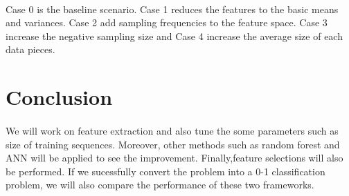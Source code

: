 \documentclass{article}
\begin{document}
	\paragraph{}Case 0 is the baseline scenario. Case 1 reduces the features to the basic means and variances. Case 2 add sampling frequencies to the feature space. Case 3 increase the negative sampling size and Case 4 increase the average size of each data pieces.
	
	
	
	
	\section{Conclusion} %
	\label{sec:future_work}
	\paragraph{} We will work on feature extraction and also tune the some parameters such as size of training sequences. Moreover, other methods such as random forest and ANN will be applied to see the improvement. Finally,feature selections will also be performed. If we sucessfully convert the problem into a 0-1 classification problem, we will also compare the performance of these two frameworks.
	
\end{document}
